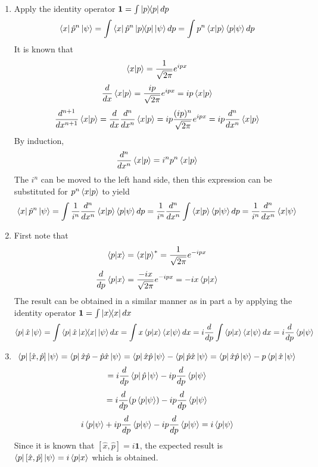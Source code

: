 \begin{sol}
\begin{enumerate}[label=\textbf{(\alph*)}]
\item
Apply the identity operator $\mathbf{1}=\int\ketbra{p}{p}dp$ 
$$\bra x\hat p^n\ket\psi=\int\bra x\hat p^n\ketbra{p}{p}\ket\psi dp=\int p^n\braket{x}{p}\braket{p}{\psi}dp$$  It is known that 
$$\braket{x}{p}=\frac{1}{\sqrt{2\pi}}e^{ipx}$$
$$\frac{d}{dx}\braket{x}{p}=\frac{ip}{\sqrt{2\pi}}e^{ipx}=ip\braket{x}{p}$$ 
$$\frac{d^{n+1}}{dx^{n+1}}\braket{x}{p}=\frac{d}{dx}\frac{d^n}{dx^n}\braket{x}{p}=ip\frac{(ip)^n}{\sqrt{2\pi}}e^{ipx}=ip\frac{d^n}{dx^n}\braket{x}{p}$$ 
By induction,$$\frac{d^n}{dx^n}\braket{x}{p}=i^np^n\braket{x}{p}$$ 
The $i^n$ can be moved to the left hand side, then this expression can be substituted for $p^n\braket{x}{p}$ to yield
$$\bra x\hat p^n\ket\psi=\int \frac{1}{i^n}\frac{d^n}{dx^n}\braket{x}{p}\braket{p}{\psi}dp=\frac{1}{i^n}\frac{d^n}{dx^n}\int \braket{x}{p}\braket{p}{\psi}dp=\frac{1}{i^n}\frac{d^n}{dx^n}\braket{x}{\psi}$$ \item
First note that
$$\braket{p}{x}=\braket{x}{p}^*=\frac{1}{\sqrt{2\pi}}e^{-ipx}$$
$$\frac{d}{dp}\braket{p}{x}=\frac{-ix}{\sqrt{2\pi}}e^{-ipx}=-ix\braket{p}{x}$$
The result can be obtained in a similar manner as in part a by applying the identity operator $\mathbf{1}=\int\ketbra{x}{x}dx$ 
$$ \bra p\hat x\ket\psi=\int \bra p\hat x\ketbra {x}{x}\ket\psi dx=\int x\braket{p}{x}\braket{x}{\psi}dx=i\frac{d}{dp}\int \braket{p}{x}\braket{x}{\psi}dx=i\frac{d}{dp}\braket{p}{\psi}$$ 
\item
$$\bra p[\hat x,\hat p]\ket\psi=\bra p\hat x\hat p-\hat p\hat x\ket\psi=\bra p\hat x\hat p\ket\psi-\bra p\hat p\hat x\ket\psi=\bra p\hat x\hat p\ket\psi-p\bra p\hat x\ket\psi$$  
$$=i\frac{d}{dp}\bra p\hat p\ket\psi-ip\frac{d}{dp}\braket{p}{\psi}$$
$$=i\frac{d}{dp}(p\braket{p}{\psi})-ip\frac{d}{dp}\braket{p}{\psi}$$
$$i\braket{p}{\psi}+ip\frac{d}{dp}\braket{p}{\psi}-ip\frac{d}{dp}\braket{p}{\psi}=i\braket{p}{\psi}$$ 
Since it is known that $[\hat x,\hat p]=i\mathbf{1}$, the expected result is $\bra p[\hat x,\hat p]\ket\psi=i\braket{p}{x}$ which is obtained.

\end{enumerate}
\end{sol}